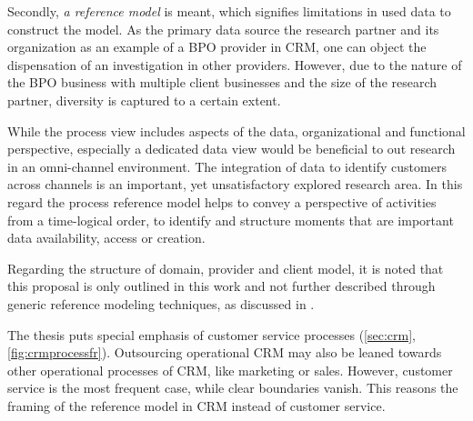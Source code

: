 Secondly, \textit{a reference model} is meant, which signifies limitations in used data to construct the model. As the primary data source the research partner and its organization as an example of a BPO provider in CRM, one can object the dispensation of an investigation in other providers. However, due to the nature of the BPO business with multiple client businesses and the size of the research partner, diversity is captured to a certain extent. 

While the process view includes aspects of the data, organizational and functional perspective, especially a dedicated data view would be beneficial to out research in an omni-channel environment. The integration of data to identify customers across channels is an important, yet unsatisfactory explored research area. In this regard the process reference model helps to convey a perspective of activities from a time-logical order, to identify and structure moments that are important \wrt data availability, access or creation. 

Regarding the structure of domain, provider and client model, it is noted that this proposal is only outlined in this work and not further described through generic reference modeling techniques, as discussed in \cite{delfmann2006adaptive, brocke2003referenzmodellierung}. 

The thesis puts special emphasis of customer service processes (\cf \ref{sec:crm},  \Fig \ref{fig:crmprocessfr}). Outsourcing operational \acrshort{CRM} may also be leaned towards other operational processes of CRM, like marketing or sales. However, customer service is the most frequent case, while clear boundaries vanish. This reasons the framing of the reference model in \acrshort{CRM} instead of customer service. 


